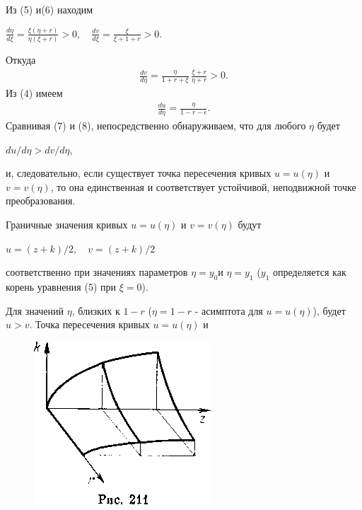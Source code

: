 \documentclass{article}
\begin{document}
Из (5) и(6) находим
\begin{center}
$\frac{d\eta}{d\xi}=\frac{\xi(\eta+r)}{\eta(\xi+r)}> 0, \quad \frac{dv}{d\xi}=\frac{\xi}{\xi+1+r}>0.$
\end{center}
Откуда
\begin{gather}
\frac{dv}{d\eta}=\frac{\eta}{1+r+\xi} \, \frac{\xi+r}{\eta+r}>0.
\end{gather}
Из (4) имеем\\%
\begin{gather}
\frac{du}{d\eta}=\frac{\eta}{1-r-\epsilon}.
\end{gather}
Сравнивая (7) и (8), непосредственно обнаруживаем, что для
любого $\eta$ будет
\begin{center}
$du/d\eta>dv/d\eta$,
\end{center}
и, следовательно, если существует точка пересечения кривых
$u=u(\eta)$ и $v=v(\eta)$, то она единственная и соответствует устойчивой,
неподвижной точке преобразования.

Граничные значения кривых $u=u(\eta)$ и $v=v(\eta)$ будут
\begin{center}
$u=(z+k)/2, \quad v=(z+k)/2$
\end{center}
соответственно при значениях параметров $\eta=y_{0}$и $\eta=y_{1}$ ($y_{1}$ определяется 
как корень уравнения (5) при $\xi=0$).

Для значений $\eta$, близких к $1-r$ ($ \eta=1-r$ - асимптота для
$u=u(\eta)$), будет $u>v$. Точка пересечения кривых $u=u(\eta)$ и

\begin{figure}

\raggedleft

\includegraphics[width=1\linewidth]{../img/img211.png}


\label{fig:mpr}

\end{figure}
\end{document}
